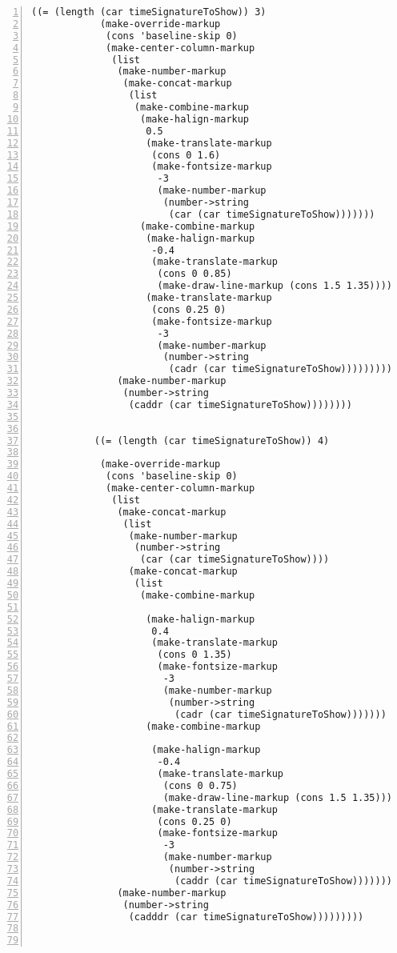 \begin{Verbatim}[numbers=left,xleftmargin=5mm]
           ((= (length (car timeSignatureToShow)) 3)
            (make-override-markup
             (cons 'baseline-skip 0)
             (make-center-column-markup
              (list
               (make-number-markup
                (make-concat-markup
                 (list
                  (make-combine-markup
                   (make-halign-markup
                    0.5
                    (make-translate-markup
                     (cons 0 1.6)
                     (make-fontsize-markup
                      -3
                      (make-number-markup
                       (number->string
                        (car (car timeSignatureToShow)))))))
                   (make-combine-markup
                    (make-halign-markup
                     -0.4
                     (make-translate-markup
                      (cons 0 0.85)
                      (make-draw-line-markup (cons 1.5 1.35))))
                    (make-translate-markup
                     (cons 0.25 0)
                     (make-fontsize-markup
                      -3
                      (make-number-markup
                       (number->string
                        (cadr (car timeSignatureToShow)))))))))))
               (make-number-markup
                (number->string
                 (caddr (car timeSignatureToShow))))))))


           ((= (length (car timeSignatureToShow)) 4)

            (make-override-markup
             (cons 'baseline-skip 0)
             (make-center-column-markup
              (list
               (make-concat-markup
                (list
                 (make-number-markup
                  (number->string
                   (car (car timeSignatureToShow))))
                 (make-concat-markup
                  (list
                   (make-combine-markup

                    (make-halign-markup
                     0.4
                     (make-translate-markup
                      (cons 0 1.35)
                      (make-fontsize-markup
                       -3
                       (make-number-markup
                        (number->string
                         (cadr (car timeSignatureToShow)))))))
                    (make-combine-markup

                     (make-halign-markup
                      -0.4
                      (make-translate-markup
                       (cons 0 0.75)
                       (make-draw-line-markup (cons 1.5 1.35))))
                     (make-translate-markup
                      (cons 0.25 0)
                      (make-fontsize-markup
                       -3
                       (make-number-markup
                        (number->string
                         (caddr (car timeSignatureToShow))))))))))))
               (make-number-markup
                (number->string
                 (cadddr (car timeSignatureToShow)))))))))



\end{Verbatim}
